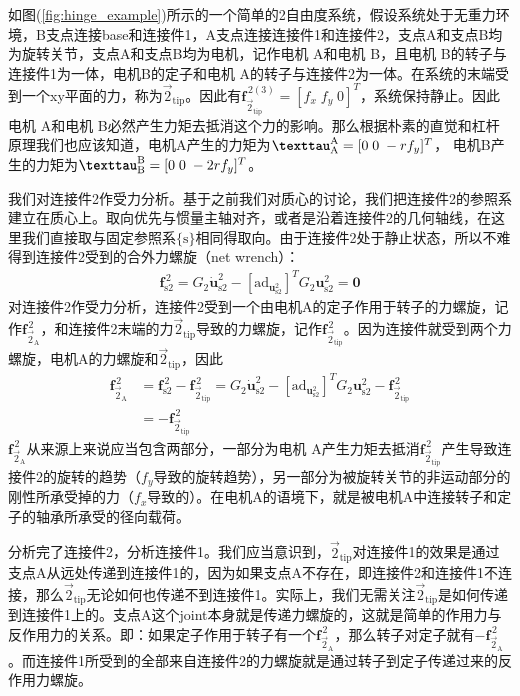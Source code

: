 \documentclass[12pt, a4paper, article, UTF8]{ctexart}
\begin{document}
如图(\ref{fig:hinge_example})所示的一个简单的2自由度系统，假设系统处于无重力环境，B支点连接base和连接件1，A支点连接连接件1和连接件2，支点A和支点B均为旋转关节，支点A和支点B均为电机，记作电机 A和电机 B，且电机 B的转子与连接件1为一体，电机B的定子和电机 A的转子与连接件2为一体。在系统的末端受到一个xy平面的力，称为$\vec{2}_\text{tip}$。因此有$\mathbf{f}^{\, 2(3)}_{\vec{2}_{\text{tip}}}=[f_x\;f_y\;0]^T$，系统保持静止。因此电机 A和电机 B必然产生力矩去抵消这个力的影响。那么根据朴素的直觉和杠杆原理我们也应该知道，电机A产生的力矩为$\textbf{\texttau}_{\text{A}}^{\text{A}} = [0\;0\; -rf_y]^T$， 电机B产生的力矩为$\textbf{\texttau}_{\text{B}}^{\text{B}} = [0\;0\; -2rf_y]^T$。

我们对连接件2作受力分析。基于之前我们对质心的讨论，我们把连接件2的参照系建立在质心上。取向优先与惯量主轴对齐，或者是沿着连接件2的几何轴线，在这里我们直接取与固定参照系$\{\text{s}\}$相同得取向。由于连接件2处于静止状态，所以不难得到连接件2受到的合外力螺旋（net wrench）：
\begin{align}
\mathbf{f}_{\text{s}2}^{\, 2} = G_2 \dot{\mathbf{u}}^{2}_{\text{s}2} - [\text{ad}_{\mathbf{u}^{2}_{\text{s}2}}]^T G_2\mathbf{u}^{2}_{\text{s}2} = \mathbf{0}
\end{align}
对连接件2作受力分析，连接件2受到一个由电机A的定子作用于转子的力螺旋，记作$\mathbf{f}_{\vec{2}_{\text{A}}}^{\,2}$，和连接件2末端的力$\vec{2}_\text{tip}$导致的力螺旋，记作$\mathbf{f}^{\, 2}_{\vec{2}_{\text{tip}}}$。因为连接件就受到两个力螺旋，电机A的力螺旋和$\vec{2}_\text{tip}$，因此
\begin{align}
\mathbf{f}_{\vec{2}_{\text{A}}}^{\,2} &= \mathbf{f}_{\text{s}2}^{\, 2} - \mathbf{f}^{\, 2}_{\vec{2}_{\text{tip}}} =  G_2 \dot{\mathbf{u}}^{2}_{\text{s}2} - [\text{ad}_{\mathbf{u}^{2}_{\text{s}2}}]^T G_2\mathbf{u}^{2}_{\text{s}2} - \mathbf{f}^{\, 2}_{\vec{2}_{\text{tip}}} \nonumber \\
&= - \mathbf{f}^{\, 2}_{\vec{2}_{\text{tip}}} \label{eq:电机Aforce}
\end{align}
$\mathbf{f}_{\vec{2}_{\text{A}}}^{\,2}$从来源上来说应当包含两部分，一部分为电机 A产生力矩去抵消$\mathbf{f}^{\, 2}_{\vec{2}_{\text{tip}}}$产生导致连接件2的旋转的趋势（$f_y$导致的旋转趋势），另一部分为被旋转关节的非运动部分的刚性所承受掉的力（$f_x$导致的）。在电机A的语境下，就是被电机A中连接转子和定子的轴承所承受的径向载荷。

分析完了连接件2，分析连接件1。我们应当意识到，$\vec{2}_\text{tip}$对连接件1的效果是通过支点A从远处传递到连接件1的，因为如果支点A不存在，即连接件2和连接件1不连接，那么$\vec{2}_\text{tip}$无论如何也传递不到连接件1。实际上，我们无需关注$\vec{2}_\text{tip}$是如何传递到连接件1上的。支点A这个joint本身就是传递力螺旋的，这就是简单的作用力与反作用力的关系。即：如果定子作用于转子有一个$\mathbf{f}_{\vec{2}_{\text{A}}}^{\,2}$，那么转子对定子就有$-\mathbf{f}_{\vec{2}_{\text{A}}}^{\,2}$。而连接件1所受到的全部来自连接件2的力螺旋就是通过转子到定子传递过来的反作用力螺旋。
\end{document}
